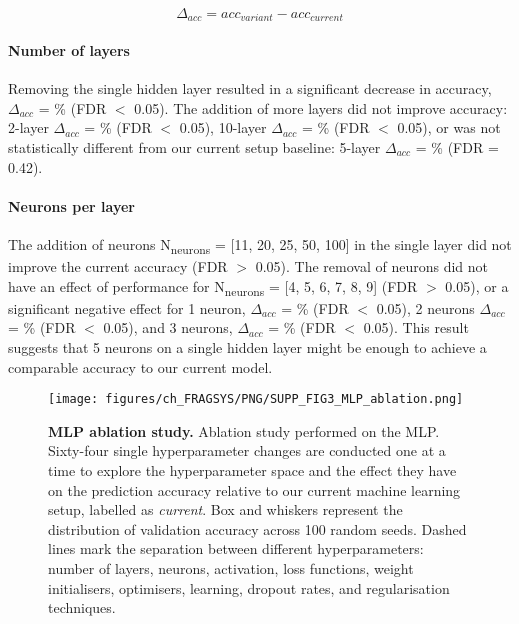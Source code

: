 \begin{equation}
\Delta_{acc} = acc_{variant} - acc_{current}
\label{eq:delta_accuracy}
\end{equation}

\paragraph{Number of layers}

Removing the single hidden layer resulted in a significant decrease in accuracy, $\Delta_{acc}$ = \% (FDR $<$ 0.05). The addition of more layers did not improve accuracy: 2-layer  $\Delta_{acc}$ = \% (FDR $<$ 0.05), 10-layer $\Delta_{acc}$ = \% (FDR $<$ 0.05), or was not statistically different from our current setup baseline: 5-layer $\Delta_{acc}$ = \% (FDR = 0.42).

\paragraph{Neurons per layer}

The addition of neurons N\textsubscript{neurons} = [11, 20, 25, 50, 100] in the single layer did not improve the current accuracy (FDR $>$ 0.05). The removal of neurons did not have an effect of performance for N\textsubscript{neurons} = [4, 5, 6, 7, 8, 9] (FDR $>$ 0.05), or a significant negative effect for 1 neuron, $\Delta_{acc}$ = \% (FDR $<$ 0.05), 2 neurons $\Delta_{acc}$ = \% (FDR $<$ 0.05), and 3 neurons, $\Delta_{acc}$ = \% (FDR $<$ 0.05). This result suggests that 5 neurons on a single hidden layer might be enough to achieve a comparable accuracy to our current model.

\begin{figure}[ht!]
    \centering
    \texttt{[image: figures/ch\_FRAGSYS/PNG/SUPP\_FIG3\_MLP\_ablation.png]}
    \caption[MLP ablation study]{\textbf{MLP ablation study.} Ablation study performed on the MLP. Sixty-four single hyperparameter changes are conducted one at a time to explore the hyperparameter space and the effect they have on the prediction accuracy relative to our current machine learning setup, labelled as \textit{current}. Box and whiskers represent the distribution of validation accuracy across 100 random seeds. Dashed lines mark the separation between different hyperparameters: number of layers, neurons, activation, loss functions, weight initialisers, optimisers, learning, dropout rates, and regularisation techniques.}
    \label{fig:mlp_ablation}
\end{figure}

